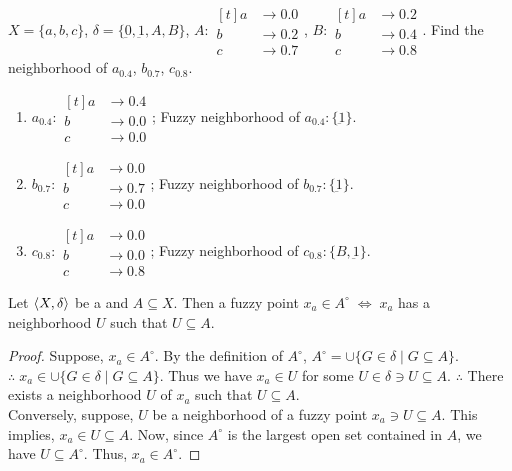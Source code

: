 \documentclass[../main-sheet.tex]{subfiles}
\begin{document}
\begin{ex}
    \(X=\{a,b,c \}\), \(\delta=\{\underbar{0},\underbar{1}, A, B \}\), \(A:
    \begin{aligned}[t]
        a&\to 0.0\\
        b&\to 0.2\\
        c&\to 0.7
    \end{aligned}\), \(B:
    \begin{aligned}[t]
        a&\to 0.2\\
        b&\to 0.4\\
        c&\to 0.8
    \end{aligned}\). Find the neighborhood of \(a_{0.4}\), \(b_{0.7}\), \(c_{0.8}\).
\end{ex}
\begin{soln}\hfill
    \begin{enumerate}
        \item \(a_{0.4}:
        \begin{aligned}[t]
            a&\to 0.4\\
            b&\to 0.0\\
            c&\to 0.0
        \end{aligned}\); Fuzzy neighborhood of \(a_{0.4}:\{\underbar{1}\}\).
        \item \(b_{0.7}:
        \begin{aligned}[t]
            a&\to 0.0\\
            b&\to 0.7\\
            c&\to 0.0
        \end{aligned}\); Fuzzy neighborhood of \(b_{0.7}:\{\underbar{1}\}\).
        \item \(c_{0.8}:
        \begin{aligned}[t]
            a&\to 0.0\\
            b&\to 0.0\\
            c&\to 0.8
        \end{aligned}\); Fuzzy neighborhood of \(c_{0.8}:\{B,\underbar{1}\}\).
    \end{enumerate}
\end{soln}
\begin{thm}
    Let \(\langle X, \delta \rangle\) be a \fts\s and \(A\subseteq X \). Then a fuzzy point \(x_a\in A^\circ\;\Leftrightarrow\;x_a\) has a neighborhood \(U \) such that \(U\subseteq A\).
\end{thm}
\begin{proof}
    Suppose, \(x_a\in A^\circ\). By the definition of \(A^\circ\), \(A^\circ=\cup\{G\in\delta\mid G\subseteq A \}\). \(\therefore\;x_a\in \cup\{G\in\delta\mid G\subseteq A \}\). Thus we have \(x_a\in U \) for some \(U\in\delta\ni U\subseteq A\). \(\therefore \) There exists a neighborhood \(U \) of \(x_a \) such that \(U\subseteq A\).\\


    Conversely, suppose, \(U \) be a neighborhood of a fuzzy point \(x_a \ni U\subseteq A \). This implies, \(x_a\in U\subseteq A \). Now, since \(A^\circ\) is the largest open set contained in \(A \), we have \(U\subseteq A^\circ\). Thus, \(x_a\in A^\circ\).
\end{proof}
\end{document}
